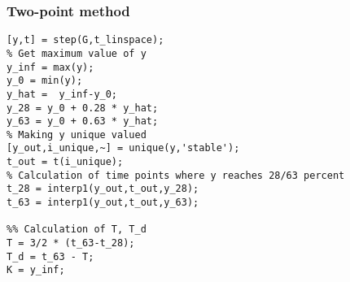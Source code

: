 \subsubsection{Two-point method} \label{app:ZN:2p_method}

\begin{lstlisting}[style=Matlab-editor,caption={Implementation of two-point method in Matlab.},captionpos=b,label={list:app:two_point_method}]
[y,t] = step(G,t_linspace);
% Get maximum value of y
y_inf = max(y);
y_0 = min(y);
y_hat =  y_inf-y_0;
y_28 = y_0 + 0.28 * y_hat;
y_63 = y_0 + 0.63 * y_hat;
% Making y unique valued
[y_out,i_unique,~] = unique(y,'stable');
t_out = t(i_unique);
% Calculation of time points where y reaches 28/63 percent
t_28 = interp1(y_out,t_out,y_28);
t_63 = interp1(y_out,t_out,y_63);

%% Calculation of T, T_d
T = 3/2 * (t_63-t_28);
T_d = t_63 - T;
K = y_inf;

\end{lstlisting}
